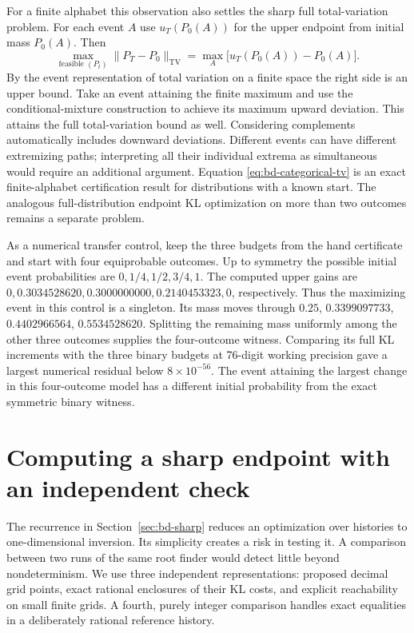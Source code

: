 \documentclass[12pt,letterpaper]{article}
\begin{document}
For a finite alphabet this observation also settles the sharp full total-variation problem. For each event $A$ use $u_T(P_0(A))$ for the upper endpoint from initial mass $P_0(A)$. Then
\begin{equation}
 \max_{\text{feasible }(P_t)}\|P_T-P_0\|_{\mathrm{TV}}
    =\max_{A}\bigl[u_T(P_0(A))-P_0(A)\bigr].
 \label{eq:bd-categorical-tv}
\end{equation}
By the event representation of total variation on a finite space the right side is an upper bound. Take an event attaining the finite maximum and use the conditional-mixture construction to achieve its maximum upward deviation. This attains the full total-variation bound as well. Considering complements automatically includes downward deviations. Different events can have different extremizing paths; interpreting all their individual extrema as simultaneous would require an additional argument. Equation \eqref{eq:bd-categorical-tv} is an exact finite-alphabet certification result for distributions with a known start. The analogous full-distribution endpoint KL optimization on more than two outcomes remains a separate problem.


As a numerical transfer control, keep the three budgets from the hand certificate and start with four equiprobable outcomes. Up to symmetry the possible initial event probabilities are $0,1/4,1/2,3/4,1$. The computed upper gains are $0,0.3034528620,0.3000000000,0.2140453323,0$, respectively. Thus the maximizing event in this control is a singleton. Its mass moves through $0.25$, $0.3399097733$, $0.4402966564$, $0.5534528620$. Splitting the remaining mass uniformly among the other three outcomes supplies the four-outcome witness. Comparing its full KL increments with the three binary budgets at 76-digit working precision gave a largest numerical residual below $8\times10^{-56}$. The event attaining the largest change in this four-outcome model has a different initial probability from the exact symmetric binary witness.

\section{Computing a sharp endpoint with an independent check}
\label{sec:lab}
The recurrence in Section~\ref{sec:bd-sharp} reduces an optimization over histories to one-dimensional inversion. Its simplicity creates a risk in testing it. A comparison between two runs of the same root finder would detect little beyond nondeterminism. We use three independent representations: proposed decimal grid points, exact rational enclosures of their KL costs, and explicit reachability on small finite grids. A fourth, purely integer comparison handles exact equalities in a deliberately rational reference history.
\end{document}
